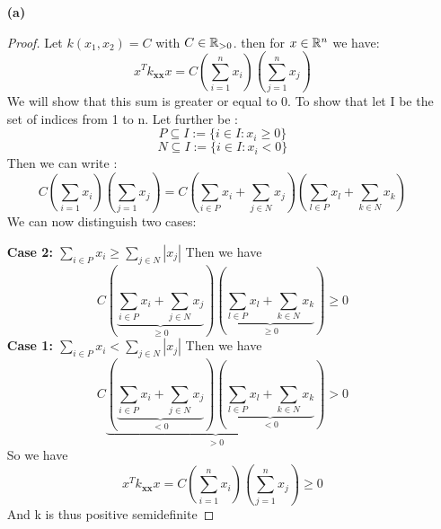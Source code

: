 \begin{itemize}
    \item[\textbf{(a)}] 
    \begin{proof} 
        Let $k(x_1,x_2)= C$ with $C \in \mathbb{R}_{>0}$. then for $x \in \mathbb{R}^n$ we have:
    \[
    x^T k_{\textbf{xx}}x = C(\sum_{i=1}^nx_i)(\sum_{j=1}^nx_j)    
    \]
    We will show that this sum is greater or equal to 0. To show that let I be the set of indices from 1 to n. Let further be :
    \[
    P \subseteq I := \{i\in I : x_i \geq 0 \}   
    \]
    \[
    N \subseteq I := \{i\in I : x_i < 0 \}   
    \]
    Then we can write :
    \[
        C(\sum_{i=1}x_i)(\sum_{j=1}x_j)  =   C(\sum_{i \in P}x_i+ \sum_{j \in N}x_j)(\sum_{l \in P}x_l+ \sum_{k \in N}x_k)  
    \]
    We can now distinguish two cases:

    \textbf{Case 2: $\sum_{i\in P} x_i \geq \sum_{j \in N} |x_j|$}
    Then we have 
    \[
        C(\underbrace{\sum_{i \in P}x_i+ \sum_{j \in N}x_j}_{\geq 0})(\underbrace{\sum_{l \in P}x_l+ \sum_{k \in N}x_k}_{\geq 0}) \geq 0    
    \]
    \textbf{Case 1: $\sum_{i\in P} x_i < \sum_{j \in N} |x_j|$}
    Then we have 
    \[
        C \underbrace{(\underbrace{\sum_{i \in P}x_i+ \sum_{j \in N}x_j}_{< 0})(\underbrace{\sum_{l \in P}x_l+ \sum_{k \in N}x_k}_{< 0})}_{>0} > 0    
    \]
    So we have 
    \[
        x^T k_{\textbf{xx}}x = C(\sum_{i=1}^nx_i)(\sum_{j=1}^nx_j) \geq 0
    \]
    And k is thus positive semidefinite
    \end{proof}
    
\end{itemize}